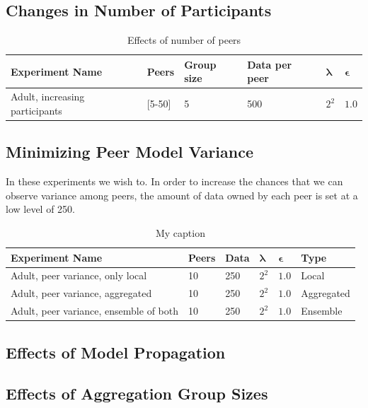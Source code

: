\subsection{Changes in Number of Participants}

\begin{table}[h]
	\centering
	\caption{Effects of number of peers}
	\label{my-label}
	\begin{tabular}{|l|l|l|l|l|l|}
		\textbf{Experiment Name}                & \textbf{Peers}      & \textbf{Group size} & \textbf{Data per peer} & $\boldsymbol{\lambda}$ & $\boldsymbol{\epsilon}$ \\
		\hline
		Adult, increasing participants & {[}5-50{]} & 5          & 500  & $2^{2}$   & $1.0$     
	\end{tabular}
\end{table}

\subsection{Minimizing Peer Model Variance}

In these experiments we wish to. In order to increase the chances that we can observe variance among peers, the amount of data owned by each peer is set at a low level of 250.

\begin{table}[h]
	\centering
	\caption{My caption}
	\label{my-label}
	\begin{tabular}{|l|l|l|l|l|l|}
		{\bf Experiment Name}                  & {\bf Peers} & {\bf Data} & $\boldsymbol{\lambda}$ & $\boldsymbol{\epsilon}$ & {\bf Type} \\
		\hline
		Adult, peer variance, only local       & 10          & 250        & $2^{2}$   & $1.0$      & Local      \\
		Adult, peer variance, aggregated       & 10          & 250        & $2^{2}$   & $1.0$      & Aggregated \\
		Adult, peer variance, ensemble of both & 10          & 250        & $2^{2}$   & $1.0$      & Ensemble  
	\end{tabular}
\end{table}

\subsection{Effects of Model Propagation}

\subsection{Effects of Aggregation Group Sizes}


